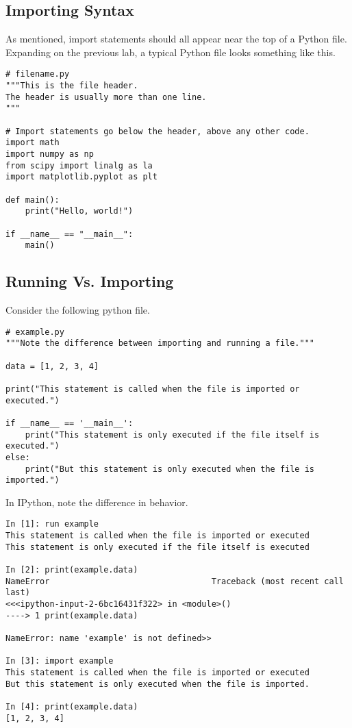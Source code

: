 \subsection*{Importing Syntax}

As mentioned, import statements should all appear near the top of a Python file.
Expanding on the previous lab, a typical Python file looks something like this.

\begin{lstlisting}
# filename.py
"""This is the file header.
The header is usually more than one line.
"""

# Import statements go below the header, above any other code.
import math
import numpy as np
from scipy import linalg as la
import matplotlib.pyplot as plt

def main():
    print("Hello, world!")

if __name__ == "__main__":
    main()
\end{lstlisting}


\subsection*{Running Vs. Importing}

Consider the following python file.
\begin{lstlisting}
# example.py
"""Note the difference between importing and running a file."""

data = [1, 2, 3, 4]

print("This statement is called when the file is imported or executed.")

if __name__ == '__main__':
    print("This statement is only executed if the file itself is executed.")
else:
    print("But this statement is only executed when the file is imported.")
\end{lstlisting}

In IPython, note the difference in behavior.

\begin{lstlisting}
In [1]: run example
This statement is called when the file is imported or executed
This statement is only executed if the file itself is executed

In [2]: print(example.data)
NameError                                 Traceback (most recent call last)
<<<ipython-input-2-6bc16431f322> in <module>()
----> 1 print(example.data)

NameError: name 'example' is not defined>>

In [3]: import example
This statement is called when the file is imported or executed
But this statement is only executed when the file is imported.

In [4]: print(example.data)
[1, 2, 3, 4]

\end{lstlisting}

